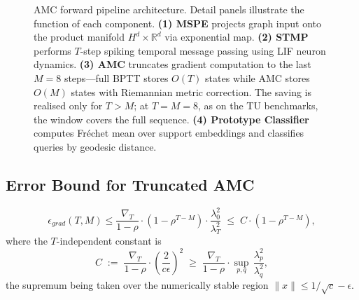 \documentclass[a4paper,fleqn]{cas-dc}
\begin{document}
\begin{figure}[pos=htbp]
\caption{AMC forward pipeline architecture. Detail panels illustrate the function of each component. \textbf{(1) MSPE} projects graph input onto the product manifold $H^d{\times}\mathbb{R}^d$ via exponential map. \textbf{(2) STMP} performs $T$-step spiking temporal message passing using LIF neuron dynamics. \textbf{(3) AMC} truncates gradient computation to the last $M\!=\!8$ steps---full BPTT stores $O(T)$ states while AMC stores $O(M)$ states with Riemannian metric correction. The saving is realised only for $T > M$; at $T{=}M{=}8$, as on the TU benchmarks, the window covers the full sequence. \textbf{(4) Prototype Classifier} computes Fr\'echet mean over support embeddings and classifies queries by geodesic distance.}
\label{fig:architecture}
\end{figure}

\label{sec:theory}

\subsection{Error Bound for Truncated AMC}

\begin{equation}
\epsilon_{grad}(T, M) \leq \frac{\nabla_T}{1-\rho} \cdot \left(1 - \rho^{T-M}\right) \cdot \frac{\lambda_0^2}{\lambda_T^2}
\; \leq \; C \cdot \left(1 - \rho^{T-M}\right),
\label{eq:error_bound}
\end{equation}
where the $T$-independent constant is
\begin{equation}
C \;:=\; \frac{\nabla_T}{1-\rho} \cdot \left(\frac{2}{c\epsilon}\right)^{2}
\;\geq\; \frac{\nabla_T}{1-\rho} \cdot \sup_{p,q}\,\frac{\lambda_p^2}{\lambda_q^2},
\label{eq:constant_C}
\end{equation}
the supremum being taken over the numerically stable region $\|x\|\le 1/\sqrt{c}-\epsilon$.
\end{document}
